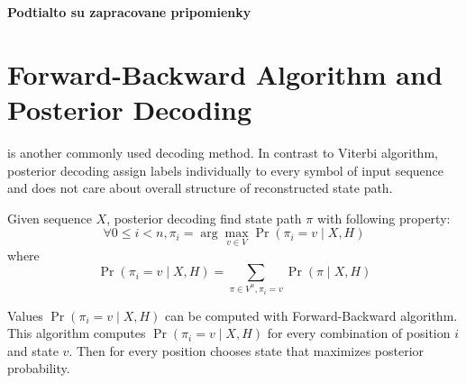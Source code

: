 \bigskip
{\large\bf Podtialto su zapracovane pripomienky}
\bigskip

\section{Forward-Backward Algorithm and Posterior Decoding}
 is another commonly used decoding method. In
contrast to Viterbi algorithm, posterior decoding assign labels individually to
every symbol of input sequence and does not care about overall structure of
reconstructed state path. 

Given sequence $X$, posterior decoding find state path $\pi$ with following
property:
\[\forall 0\leq i< n, \pi_i=\arg\max_{v\in V}\Pr\left(\pi_i=v\mid X,H\right) \]
where \[\Pr\left(\pi_i=v\mid X,H\right) = \sum_{\pi\in V^n,\pi_i=v}\Pr\left(\pi\mid X,H\right)\]

Values $\Pr\left(\pi_i=v\mid X,H\right)$ can be computed with Forward-Backward
algorithm. This algorithm computes $\Pr\left(\pi_i=v\mid X,H\right)$ for every
combination of position $i$ and state $v$. Then for every position chooses state
that maximizes posterior probability.

